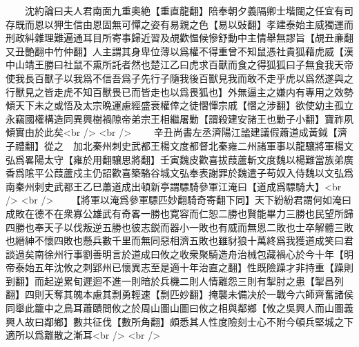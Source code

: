 　　沈約論曰夫人君南面九重奥絶【重直龍翻】陪奉朝夕義隔卿士堦闥之任宜有司存既而恩以狎生信由恩固無可憚之姿有易親之色【易以䜴翻】孝建泰始主威獨運而刑政糾雜理難遍通耳目所寄事歸近習及覘歡愠候慘舒動中主情舉無謬旨【覘丑亷翻又丑艶翻中竹仲翻】人主謂其身卑位薄以爲權不得重曾不知鼠憑社貴狐藉虎威【漢中山靖王勝曰社鼠不熏所託者然也楚江乙曰虎求百獸而食之得狐狐曰子無食我天帝使我長百獸子以我爲不信吾爲子先行子隨我後百獸見我而敢不走乎虎以爲然遂與之行獸見之皆走虎不知百獸畏已而皆走也以爲畏狐也】外無逼主之嫌内有專用之效勢傾天下未之或悟及太宗晩運慮經盛衰權倖之徒慴憚宗戚【慴之涉翻】欲使幼主孤立永竊國權構造同異興樹禍隙帝弟宗王相繼屠勦【謂殺建安諸王也勦子小翻】寶祚夙傾實由於此矣<br />
<br />
　　辛丑尚書左丞濟陽江謐建議假蕭道成黃鉞【濟子禮翻】從之　加北秦州刺史武都王楊文度都督北秦雍二州諸軍事以龍驤將軍楊文弘爲畧陽太守【雍於用翻驤思將翻】壬寅魏皮歡喜拔葭蘆斬文度魏以楊難當族弟廣香爲隂平公葭蘆戍主仍詔歡喜築駱谷城文弘奉表謝罪於魏遣子苟奴入侍魏以文弘爲南秦州刺史武都王乙巳蕭道成出頓新亭謂驃騎參軍江淹曰【道成爲驃騎大】<br />
<br />
　　【將軍以淹爲參軍驃匹妙翻騎奇寄翻下同】天下紛紛君謂何如淹曰成敗在德不在衆寡公雄武有奇畧一勝也寛容而仁恕二勝也賢能畢力三勝也民望所歸四勝也奉天子以伐叛逆五勝也彼志鋭而器小一敗也有威而無恩二敗也士卒解體三敗也縉紳不懷四敗也懸兵數千里而無同惡相濟五敗也雖豺狼十萬終爲我獲道成笑曰君談過矣南徐州行事劉善明言於道成曰攸之收衆聚騎造舟治械包藏禍心於今十年【明帝泰始五年沈攸之刺郢州已懷異志至是適十年治直之翻】性既險躁才非持重【躁則到翻】而起逆累旬遲迴不進一則暗於兵機二則人情離怨三則有掣肘之患【掣昌列翻】四則天奪其魄本慮其剽勇輕速【剽匹妙翻】掩襲未備决於一戰今六師齊奮諸侯同舉此籠中之鳥耳蕭賾問攸之於周山圖山圖曰攸之相與鄰鄉【攸之吳興人而山圖義興人故曰鄰鄉】數共征伐【數所角翻】頗悉其人性度險刻士心不附今頓兵堅城之下適所以爲離散之漸耳<br />
<br />
